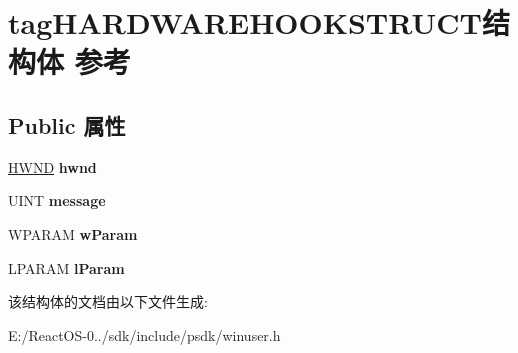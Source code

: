 \hypertarget{structtag_h_a_r_d_w_a_r_e_h_o_o_k_s_t_r_u_c_t}{}\section{tag\+H\+A\+R\+D\+W\+A\+R\+E\+H\+O\+O\+K\+S\+T\+R\+U\+C\+T结构体 参考}
\label{structtag_h_a_r_d_w_a_r_e_h_o_o_k_s_t_r_u_c_t}
\subsection*{Public 属性}
\begin{DoxyCompactItemize}
\item 
\mbox{\label{structtag_h_a_r_d_w_a_r_e_h_o_o_k_s_t_r_u_c_t_a081fc49c8c913cda97b90e935111211d}} 
\hyperlink{interfacevoid}{H\+W\+ND} {\bfseries hwnd}
\item 
\mbox{\label{structtag_h_a_r_d_w_a_r_e_h_o_o_k_s_t_r_u_c_t_ad6ca322adcf7b76e623bf9ad53ff9eee}} 
U\+I\+NT {\bfseries message}
\item 
\mbox{\label{structtag_h_a_r_d_w_a_r_e_h_o_o_k_s_t_r_u_c_t_a190e3483baac904e4efffe915880a8cd}} 
W\+P\+A\+R\+AM {\bfseries w\+Param}
\item 
\mbox{\label{structtag_h_a_r_d_w_a_r_e_h_o_o_k_s_t_r_u_c_t_a0b5c49d330d35b1db65bce307e8b13f5}} 
L\+P\+A\+R\+AM {\bfseries l\+Param}
\end{DoxyCompactItemize}


该结构体的文档由以下文件生成\+:\begin{DoxyCompactItemize}
\item 
E\+:/\+React\+O\+S-\/0../sdk/include/psdk/winuser.\+h\end{DoxyCompactItemize}
